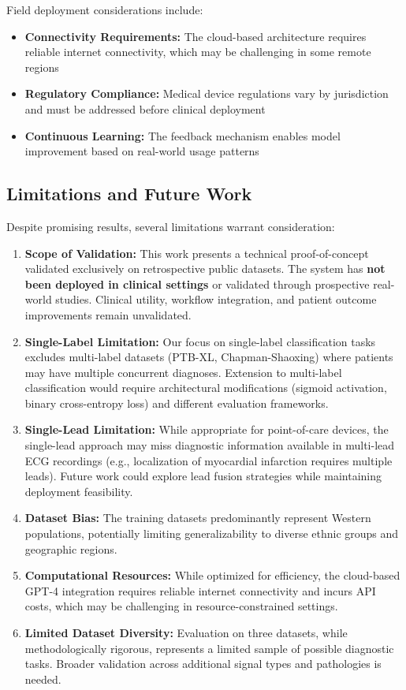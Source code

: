 \documentclass[conference]{IEEEtran}
\begin{document}
Field deployment considerations include:
\begin{itemize}
\item \textbf{Connectivity Requirements:} The cloud-based architecture requires reliable internet connectivity, which may be challenging in some remote regions
\item \textbf{Regulatory Compliance:} Medical device regulations vary by jurisdiction and must be addressed before clinical deployment
\item \textbf{Continuous Learning:} The feedback mechanism enables model improvement based on real-world usage patterns
\end{itemize}

\subsection{Limitations and Future Work}

Despite promising results, several limitations warrant consideration:

\begin{enumerate}
\item \textbf{Scope of Validation:} This work presents a technical proof-of-concept validated exclusively on retrospective public datasets. The system has \textbf{not been deployed in clinical settings} or validated through prospective real-world studies. Clinical utility, workflow integration, and patient outcome improvements remain unvalidated.

\item \textbf{Single-Label Limitation:} Our focus on single-label classification tasks excludes multi-label datasets (PTB-XL, Chapman-Shaoxing) where patients may have multiple concurrent diagnoses. Extension to multi-label classification would require architectural modifications (sigmoid activation, binary cross-entropy loss) and different evaluation frameworks.

\item \textbf{Single-Lead Limitation:} While appropriate for point-of-care devices, the single-lead approach may miss diagnostic information available in multi-lead ECG recordings (e.g., localization of myocardial infarction requires multiple leads). Future work could explore lead fusion strategies while maintaining deployment feasibility.

\item \textbf{Dataset Bias:} The training datasets predominantly represent Western populations, potentially limiting generalizability to diverse ethnic groups and geographic regions.

\item \textbf{Computational Resources:} While optimized for efficiency, the cloud-based GPT-4 integration requires reliable internet connectivity and incurs API costs, which may be challenging in resource-constrained settings.

\item \textbf{Limited Dataset Diversity:} Evaluation on three datasets, while methodologically rigorous, represents a limited sample of possible diagnostic tasks. Broader validation across additional signal types and pathologies is needed.
\end{enumerate}
\end{document}
